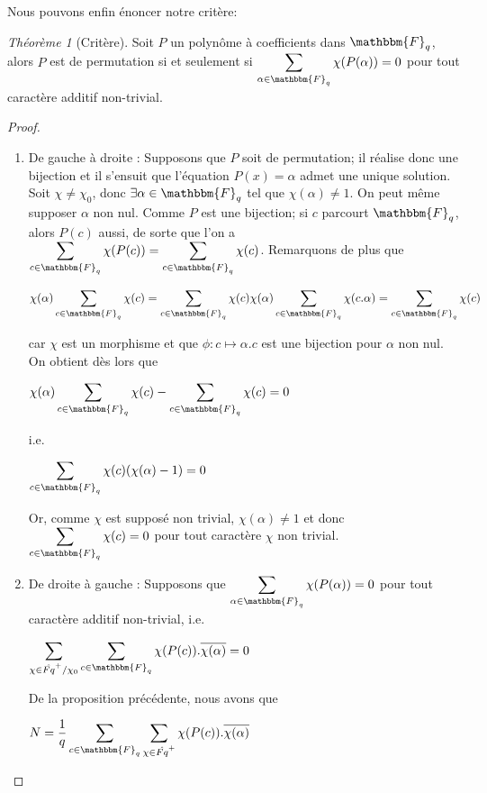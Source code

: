 \documentclass[12pt]{article}
\theoremstyle{remark}\newtheorem{note}{Note}
\theoremstyle{remark}\newtheorem{nota}{Notation}
\newcommand{\Fq}{\mathbbm{F}_q}
\newtheorem{theorem}{Théorème}
\theoremstyle{definition}
\begin{document}
Nous pouvons enfin énoncer notre critère:

\begin{theorem}[Critère]
Soit $P$ un polynôme à coefficients dans $\Fq$, alors $P$ est de permutation si et seulement si $\displaystyle\sum_{\alpha \in \Fq} \chi(P(\alpha)) = 0$ pour tout caractère additif non-trivial.
\end{theorem}

\begin{proof}
	\begin{enumerate}[label = \roman*)]
		\item De gauche à droite : Supposons que $P$ soit de permutation; il réalise donc une bijection et il s'ensuit que l'équation $P(x) = \alpha$ admet une unique solution. Soit $\chi \neq \chi_0$, donc $\exists \alpha \in \Fq$ tel que $\chi(\alpha)\neq 1$. On peut même supposer $\alpha$ non nul. Comme $P$ est une bijection; si $c$ parcourt $\Fq$, alors $P(c)$ aussi, de sorte que l'on a $\displaystyle\sum_{c\in\Fq}\chi(P(c)) = \displaystyle\sum_{c\in\Fq}\chi(c)$. \newline
Remarquons de plus que
\begin{center}$\chi(\alpha)\displaystyle\sum_{c\in\Fq}\chi(c) = \displaystyle\sum_{c\in\Fq}\chi(c)\chi(\alpha) \displaystyle\sum_{c\in\Fq}\chi(c.\alpha) =\displaystyle\sum_{c\in\Fq}\chi(c)$\end{center}
car $\chi$ est un morphisme et que $\phi :c \longmapsto \alpha.c$ est une bijection pour $\alpha$ non nul.
On obtient dès lors que
\begin{center} 
$\chi(\alpha)\displaystyle\sum_{c\in\Fq}\chi(c) - \displaystyle\sum_{c\in\Fq}\chi(c) =0$
\end{center}
i.e.
\begin{center}
$\displaystyle\sum_{c\in\Fq}\chi(c)(\chi(\alpha) -1) = 0$
\end{center}
Or, comme $
\chi$ est supposé non trivial, $\chi(\alpha) \neq 1$ et donc $\displaystyle\sum_{c\in\Fq}\chi(c) = 0$ pour tout caractère $\chi$ non trivial.
		\item De droite à gauche : Supposons que $\displaystyle\sum_{\alpha \in \Fq} \chi(P(\alpha)) = 0$ pour tout caractère additif non-trivial, i.e. 
		\begin{center} $\displaystyle	\sum_{\chi \in \hat{Fq}^+/\chi_0} \sum_{c\in\Fq} \chi(P(c)).\overline{\chi(\alpha)}=0$ \end{center}
De la proposition précédente, nous avons que 
\begin{center} $N = \displaystyle \frac{1}{q} \sum_{c\in\Fq}\sum_{\chi \in \hat{Fq}^+} \chi(P(c)).\overline{\chi(\alpha)}$ \end{center}

\end{enumerate}
\end{proof}
\end{document}
